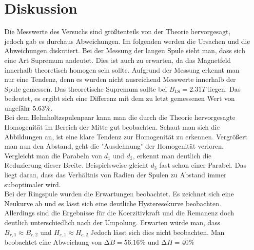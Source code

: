 \section{Diskussion}
\label{sec:Diskussion}

Die Messwerte des Versuchs sind größtenteils von der Theorie hervorgesagt, jedoch gab es durchaus Abweichungen.
Im folgenden werden die Ursachen und die Abweichungen diskutiert.
Bei der Messung der langen Spule sieht man, dass sich eine Art Supremum andeutet.
Dies ist auch zu erwarten, da das Magnetfeld innerhalb theoretisch homogen sein sollte.
Aufgrund der Messung erkennt man nur eine Tendenz, denn es wurden nicht ausreichend Messwerte innerhalb der Spule gemessen.
Das theoretische Supremum sollte bei $B_{\text{LS}} = 2.31 T$ liegen.
Das bedeutet, es ergibt sich eine Differenz mit dem zu letzt gemessenen Wert von ungefähr $5.63\%$. \\

Bei dem Helmholtzspulenpaar kann man die durch die Theorie hervorgesagte Homogenität im Bereich der Mitte gut beobachten.
Schaut man sich die Abbildungen an, ist eine klare Tendenz zur Homogenität zu erkennen.
Vergrößert man nun den Abstand, geht die "Ausdehnung" der Homogenität verloren.
Vergleicht man die Parabeln von $d_{1}$ und $d_{3}$, erkennt man deutlich die Reduzierung dieser Breite.
Beispielsweise gleicht $d_{3}$ fast schon einer Parabel.
Das liegt daran, dass das Verhältnis von Radien der Spulen zu Abstand immer suboptimaler wird.  \\

Bei der Ringspule wurden die Erwartungen beobachtet.
Es zeichnet sich eine Neukurve ab und es lässt sich eine deutliche Hysteresekurve beobachten.
Allerdings sind die Ergebnisse für die Koerzitivkraft und die Remanenz doch deutlich unterschiedlich nach der Umpolung.
Erwarten würde man, dass $B_{r,1} \approx B_{r,2}$ und $H_{c,1} \approx H_{c,2}$
Jedoch lässt sich dies nicht beobachten. 
Man beobachtet eine Abweichung von $\increment B = 56.16 \%$ und  $\increment H = 40 \%$